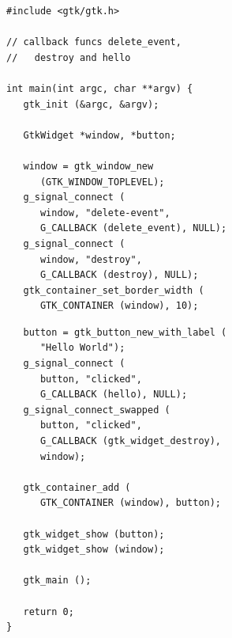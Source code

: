 \begin{frame}[fragile]
%
%
\begin{codebox}
\begin{verbatim}
#include <gtk/gtk.h>

// callback funcs delete_event, 
//   destroy and hello

int main(int argc, char **argv) {
   gtk_init (&argc, &argv);
   
   GtkWidget *window, *button;
    
   window = gtk_window_new 
      (GTK_WINDOW_TOPLEVEL);
   g_signal_connect (
      window, "delete-event",
      G_CALLBACK (delete_event), NULL);
   g_signal_connect (
      window, "destroy",
      G_CALLBACK (destroy), NULL);   
   gtk_container_set_border_width (
      GTK_CONTAINER (window), 10);
\end{verbatim}
\end{codebox}
%
\begin{codebox}
\begin{verbatim}
   button = gtk_button_new_with_label (
      "Hello World");
   g_signal_connect (
      button, "clicked",
      G_CALLBACK (hello), NULL);
   g_signal_connect_swapped (
      button, "clicked",
      G_CALLBACK (gtk_widget_destroy),
      window);
    
   gtk_container_add (
      GTK_CONTAINER (window), button);
    
   gtk_widget_show (button);
   gtk_widget_show (window);
    
   gtk_main ();
    
   return 0;
}
\end{verbatim}
\end{codebox}
%
\end{frame}


